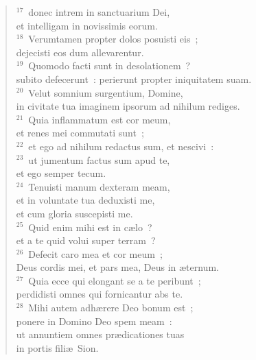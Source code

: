 \begin{flushleft}
\begin{verse}
${}^{17}$~donec intrem in sanctuarium Dei,\\ et intelligam in novissimis eorum.\\
${}^{18}$~Verumtamen propter dolos posuisti eis~;\\ dejecisti eos dum allevarentur.\\
${}^{19}$~Quomodo facti sunt in desolationem~?\\ subito defecerunt~: perierunt propter iniquitatem suam.\\
${}^{20}$~Velut somnium surgentium, Domine,\\ in civitate tua imaginem ipsorum ad nihilum rediges.\\
${}^{21}$~Quia inflammatum est cor meum,\\ et renes mei commutati sunt~;\\
${}^{22}$~et ego ad nihilum redactus sum, et nescivi~:\\
${}^{23}$~ut jumentum factus sum apud te,\\ et ego semper tecum.\\
${}^{24}$~Tenuisti manum dexteram meam,\\ et in voluntate tua deduxisti me,\\ et cum gloria suscepisti me.\\
${}^{25}$~Quid enim mihi est in c\ae lo~?\\ et a te quid volui super terram~?\\
${}^{26}$~Defecit caro mea et cor meum~;\\ Deus cordis mei, et pars mea, Deus in \ae ternum.\\
${}^{27}$~Quia ecce qui elongant se a te peribunt~;\\ perdidisti omnes qui fornicantur abs te.\\
${}^{28}$~Mihi autem adh\ae rere Deo bonum est~;\\ ponere in Domino Deo spem meam~:\\ ut annuntiem omnes pr\ae dicationes tuas\\ in portis fili\ae\ Sion.\end{verse}\end{flushleft}



